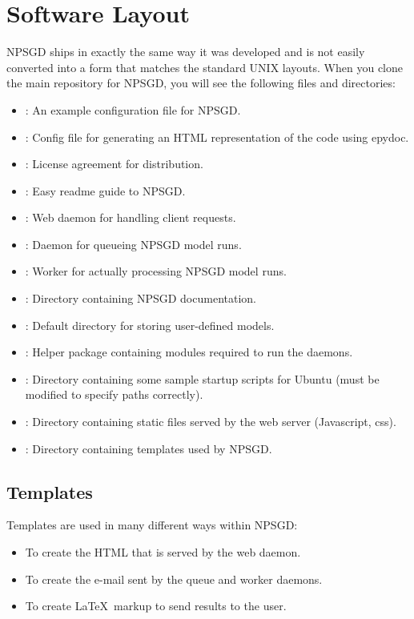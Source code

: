 \documentclass{article}
\begin{document}
\section{Software Layout}
NPSGD ships in exactly the same way it was developed and is not easily converted
into a form that matches the standard UNIX layouts. When you clone the main
repository for NPSGD, you will see the following files and directories:
\begin{itemize}
    \item {}: An example configuration file for NPSGD.
    \item {}: Config file for generating an HTML representation
          of the code using epydoc.
    \item {}: License agreement for distribution.
    \item {}: Easy readme guide to NPSGD.
    \item {}: Web daemon for handling client requests.
    \item {}: Daemon for queueing NPSGD model runs.
    \item {}: Worker for actually processing NPSGD model
          runs.
    \item {}: Directory containing NPSGD documentation.
    \item {}: Default directory for storing user-defined models.
    \item {}: Helper package containing modules required to run the
          daemons.
    \item {}: Directory containing some sample startup scripts for
          Ubuntu (must be modified to specify paths correctly).
    \item {}: Directory containing static files served by the web
          server (Javascript, css).
    \item {}: Directory containing templates used by NPSGD.
\end{itemize}

\subsection{Templates}
Templates are used in many different ways within NPSGD:
\begin{itemize}
    \item To create the HTML that is served by the web daemon.
    \item To create the e-mail sent by the queue and worker daemons.
    \item To create \LaTeX\ markup to send results to the user.
\end{itemize}
\end{document}
